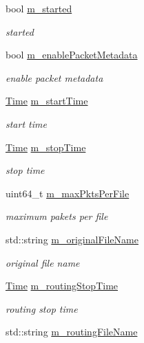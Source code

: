 \begin{DoxyCompactItemize}
bool \hyperlink{classns3_1_1AnimationInterface_aa8a6ce3aa7ad35aa7c5313f2834825f9}{m\+\_\+started}
\begin{DoxyCompactList}\small\item\em started \end{DoxyCompactList}\item 
bool \hyperlink{classns3_1_1AnimationInterface_a5dce9d3fd3d987ef97f68528c0bbf1d0}{m\+\_\+enable\+Packet\+Metadata}
\begin{DoxyCompactList}\small\item\em enable packet metadata \end{DoxyCompactList}\item 
\hyperlink{classns3_1_1Time}{Time} \hyperlink{classns3_1_1AnimationInterface_aca75b39a0e49369b5fb57c0d665f19e0}{m\+\_\+start\+Time}
\begin{DoxyCompactList}\small\item\em start time \end{DoxyCompactList}\item 
\hyperlink{classns3_1_1Time}{Time} \hyperlink{classns3_1_1AnimationInterface_a641bd6d111b12ce588debb0104bbe6c8}{m\+\_\+stop\+Time}
\begin{DoxyCompactList}\small\item\em stop time \end{DoxyCompactList}\item 
uint64\+\_\+t \hyperlink{classns3_1_1AnimationInterface_a608065fd3e594b67f812353171a1303b}{m\+\_\+max\+Pkts\+Per\+File}
\begin{DoxyCompactList}\small\item\em maximum pakets per file \end{DoxyCompactList}\item 
std\+::string \hyperlink{classns3_1_1AnimationInterface_adaa4d1de0561b10ab094933fab370a73}{m\+\_\+original\+File\+Name}
\begin{DoxyCompactList}\small\item\em original file name \end{DoxyCompactList}\item 
\hyperlink{classns3_1_1Time}{Time} \hyperlink{classns3_1_1AnimationInterface_aa0e26a1672f03b761f1633814444a5b9}{m\+\_\+routing\+Stop\+Time}
\begin{DoxyCompactList}\small\item\em routing stop time \end{DoxyCompactList}\item 
std\+::string \hyperlink{classns3_1_1AnimationInterface_a206e3704698a949eed175f9c6df414fe}{m\+\_\+routing\+File\+Name}

\end{DoxyCompactItemize}
